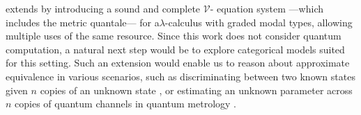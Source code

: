 
  \cite{dahlqvistCompleteVEquationalSystem2023} extends  \cite{dahlqvist2023syntactic} by introducing a sound and complete $\mathcal{V}$- equation system ---which includes the metric quantale--- for a$\lambda$-calculus with graded modal types, allowing multiple uses of the same resource. Since this work does not consider quantum computation, a natural next step would be to explore categorical models suited for this setting. Such an extension would enable us to reason about approximate equivalence in various scenarios, such as discriminating between two known states given $n$ copies of an unknown state \cite{Multiple_copy_two_state_discrimination}, or estimating an unknown parameter across $n$ copies of quantum channels in quantum metrology \cite{Giovannetti_Quantum_Metrology, Zhou_Limits_Noisy_Quantum_Metrology}.









